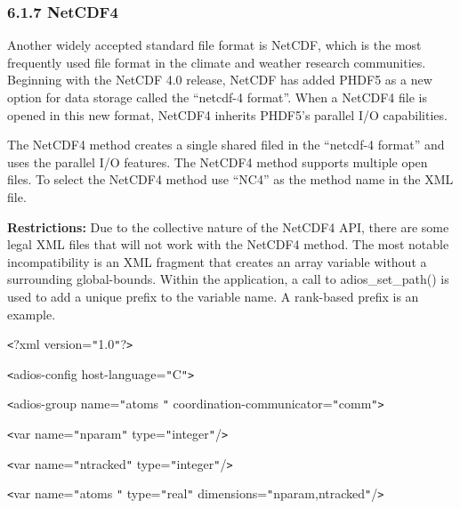 \vspace{10pt}
\subsubsection*{{\large \textbf{6.1.7 NetCDF4}}}

\vspace{10pt}
Another widely accepted standard file format is NetCDF, which is the most frequently 
used file format in the climate and weather research communities.  Beginning with 
the NetCDF 4.0 release, NetCDF has added PHDF5 as a new option for data storage 
called the ``netcdf-4 format''.  When a NetCDF4 file is opened in this new format, 
NetCDF4 inherits PHDF5's parallel I/O capabilities.

\vspace{10pt}
The NetCDF4 method creates a single shared filed in the ``netcdf-4 format'' and 
uses the parallel I/O features.  The NetCDF4 method supports multiple open files. 
 To select the NetCDF4 method use ``NC4'' as the method name in the XML file.

\vspace{10pt}
\textbf{Restrictions:} Due to the collective nature of the NetCDF4 API, there are 
some legal XML files that will not work with the NetCDF4 method.  The most notable 
incompatibility is an XML fragment that creates an array variable without a surrounding 
global-bounds.  Within the application, a call to adios\_set\_path() is used to 
add a unique prefix to the variable name.  A rank-based prefix is an example. 


\vspace{22pt}
\leftskip=18pt
\texttt{<}?xml version=\texttt{"}1.0\texttt{"}?\texttt{>}

\vspace{10pt}
\texttt{<}adios-config host-language=\texttt{"}C\texttt{"}\texttt{>}

\vspace{10pt}
\parindent=14pt
\texttt{<}adios-group name=\texttt{"}atoms \texttt{"} coordination-communicator=\texttt{"}comm\texttt{"}\texttt{>}

\vspace{10pt}
\parindent=28pt
\texttt{<}var name=\texttt{"}nparam\texttt{"} type=\texttt{"}integer\texttt{"}/\texttt{>}

\vspace{10pt}
\texttt{<}var name=\texttt{"}ntracked\texttt{"} type=\texttt{"}integer\texttt{"}/\texttt{>}

\vspace{10pt}
\parindent=57pt
\texttt{<}var name=\texttt{"}atoms \texttt{"} type=\texttt{"}real\texttt{"} dimensions=\texttt{"}nparam,ntracked\texttt{"}/\texttt{>}

